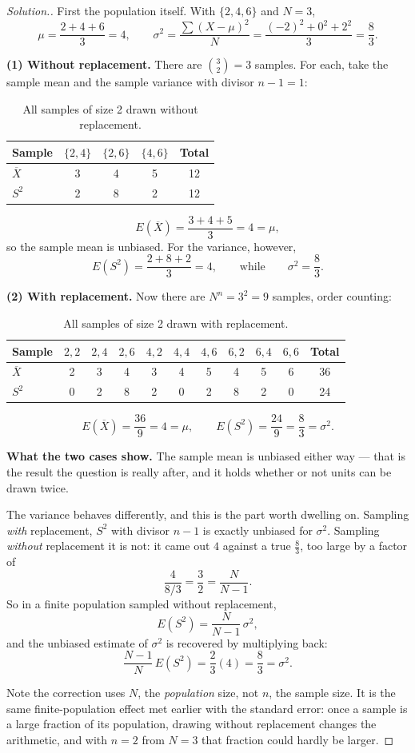 \documentclass[11pt,a4paper]{article}
\theoremstyle{definition}
\newenvironment{solution}
  {\renewcommand{\qedsymbol}{}\begin{proof}[\textit{Solution}.]}
  {\end{proof}}
\begin{document}
\begin{solution}
First the population itself. With $\{2,4,6\}$ and $N=3$,
\[\mu=\frac{2+4+6}{3}=4,\qquad
\sigma^2=\frac{\sum(X-\mu)^2}{N}=\frac{(-2)^2+0^2+2^2}{3}=\frac{8}{3}.\]

\textbf{(1) Without replacement.} There are $\binom{3}{2}=3$ samples. For each, take the
sample mean and the sample variance with divisor $n-1=1$:
\begin{table}[H]
\centering
\begin{tabular}{|l|c|c|c|c|}
\hline
Sample & $\{2,4\}$ & $\{2,6\}$ & $\{4,6\}$ & Total\\
\hline
$\overline{X}$ & 3 & 4 & 5 & 12\\
$S^2$ & 2 & 8 & 2 & 12\\
\hline
\end{tabular}
\caption{All samples of size 2 drawn without replacement.}
\end{table}
\[E(\overline{X})=\frac{3+4+5}{3}=4=\mu,\]
so the sample mean is unbiased. For the variance, however,
\[E(S^2)=\frac{2+8+2}{3}=4,\qquad\text{while}\qquad \sigma^2=\frac{8}{3}.\]

\textbf{(2) With replacement.} Now there are $N^n=3^2=9$ samples, order counting:
\begin{table}[H]
\centering
\begin{tabular}{|l|c|c|c|c|c|c|c|c|c|c|}
\hline
Sample & $2,2$ & $2,4$ & $2,6$ & $4,2$ & $4,4$ & $4,6$ & $6,2$ & $6,4$ & $6,6$ & Total\\
\hline
$\overline{X}$ & 2 & 3 & 4 & 3 & 4 & 5 & 4 & 5 & 6 & 36\\
$S^2$ & 0 & 2 & 8 & 2 & 0 & 2 & 8 & 2 & 0 & 24\\
\hline
\end{tabular}
\caption{All samples of size 2 drawn with replacement.}
\end{table}
\[E(\overline{X})=\frac{36}{9}=4=\mu,\qquad
E(S^2)=\frac{24}{9}=\frac{8}{3}=\sigma^2.\]

\textbf{What the two cases show.} The sample mean is unbiased either way --- that is the
result the question is really after, and it holds whether or not units can be drawn twice.

The variance behaves differently, and this is the part worth dwelling on. Sampling
\emph{with} replacement, $S^2$ with divisor $n-1$ is exactly unbiased for $\sigma^2$.
Sampling \emph{without} replacement it is not: it came out $4$ against a true $\frac{8}{3}$,
too large by a factor of
\[\frac{4}{8/3}=\frac{3}{2}=\frac{N}{N-1}.\]
So in a finite population sampled without replacement,
\[E(S^2)=\frac{N}{N-1}\,\sigma^2,\]
and the unbiased estimate of $\sigma^2$ is recovered by multiplying back:
\[\frac{N-1}{N}\,E(S^2)=\frac{2}{3}(4)=\frac{8}{3}=\sigma^2.\]

Note the correction uses $N$, the \emph{population} size, not $n$, the sample size. It is the
same finite-population effect met earlier with the standard error: once a sample is a large
fraction of its population, drawing without replacement changes the arithmetic, and with
$n=2$ from $N=3$ that fraction could hardly be larger.
\end{solution}
\end{document}
